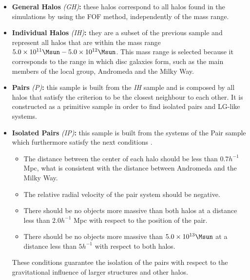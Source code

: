\begin{itemize}
\item \textbf{General Halos} \textit{(GH)}\textbf{:} these halos correspond
to all halos found in the simulations by using the FOF method, independently
of the mass range.

\item \textbf{Individual Halos} \textit{(IH)}\textbf{:} they are a subset of
the previous sample and represent all halos that are within the mass range
$5.0 \times 10^{11}\Msun - 5.0\times 10 ^{12}\Msun$. This mass range is 
selected because it corresponds to the range in which disc galaxies form,
such as the main members of the local group, Andromeda and the Milky Way.

\item \textbf{Pairs} \textit{(P)}\textbf{:} this sample is built from the 
\textit{IH} sample and is composed by all halos that satisfy the criterion
to be the closest neighbour to each other. It is constructed as a primitive
sample in order to find isolated pairs and LG-like systems.


\item \textbf{Isolated Pairs} \textit{(IP)}\textbf{:} this sample is built
from the systems of the Pair sample which furthermore satisfy the next 
conditions \cite{forero2011} \cite{forero2013}.


	\begin{itemize}
	\item The distance between the center of each halo should be less than
	$0.7 h^{-1}$ Mpc, what is consistent with the distance between Andromeda
	and the Milky Way.
	\item The relative radial velocity of the pair system should be negative.
	\item There should be no objects more massive than both halos at a distance
	less than $2.0 h^{-1}$ Mpc with respect to the position of the pair.
	\item There should be no objects more massive than $5.0 \times 10^{13}
	\Msun$ at a distance less than $5h^{-1}$ with respect to both halos.
	\end{itemize}
	

These conditions guarantee the isolation of the pairs with respect to the
gravitational influence of larger structures and other halos.



\end{itemize}
